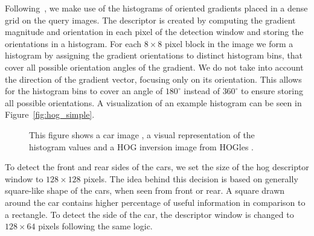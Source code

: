 Following~\citet{dalal2005}, we make use of the histograms of oriented
gradients placed in a dense grid on the query images. The descriptor is
created by computing the gradient magnitude and orientation in each pixel of
the detection window and storing the orientations in a histogram. For each $8
\times 8$ pixel block in the image we form a histogram by assigning the
gradient orientations to distinct histogram bins, that cover all possible
orientation angles of the gradient. We do not take into account the direction
of the gradient vector, focusing only on its orientation. This allows for the
histogram bins to cover an angle of $180^{\circ}$ instead of $360^{\circ}$ to
ensure storing all possible orientations. A visualization of an example
histogram can be seen in Figure~\ref{fig:hog_simple}.

\begin{figure}[b]
 \centering
{} \hspace{3mm}
 \hspace{3mm}
\caption{This figure shows a car image , a visual representation of the histogram values  and a HOG inversion image from HOGles \cite{vondrick2013hoggles} .}
\label{fig:hog_car}
\end{figure}

To detect the front and rear sides of the cars, we set the size of the hog
descriptor window to $128 \times 128$ pixels. The idea behind this decision is
based on generally square-like shape of the cars, when seen from front or
rear. A square drawn around the car contains higher percentage of useful
information in comparison to a rectangle. To detect the side of the car, the
descriptor window is changed to $128 \times 64$ pixels following the same
logic.

